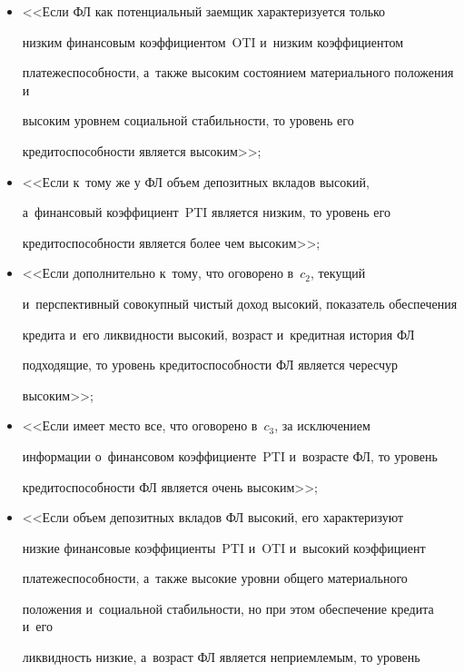  \begin{itemize} 

\item[$c_1$:] <<Если ФЛ как потенциальный заемщик характеризуется только 

низким финансовым коэффициентом~OTI и~низким коэффициентом 

пла\-те\-же\-спо\-соб\-ности, а~также высоким состоянием материального положения и~

высоким уровнем социальной стабильности, то уровень его 

кредитоспособности является высоким>>; 

  

\item[$c_2$:] <<Если к~тому же у ФЛ объем депозитных вкладов высокий, 

а~финансовый коэффициент~PTI является низким, то уровень его 

кредитоспособности является более чем высоким>>; 

  

\item[$c_3$:] <<Если дополнительно к~тому, что оговорено в~$c_2$, текущий 

и~перспективный совокупный чистый доход высокий, показатель обеспечения 

кредита и~его ликвидности высокий, возраст и~кредитная история ФЛ 

подходящие, то уровень кредитоспособности ФЛ является чересчур 

высоким>>; 

  

\item[$c_4$:] <<Если имеет место все, что оговорено в~$c_3$, за исключением 

информации о~финансовом коэффициенте~PTI и~возрасте ФЛ, то уровень 

кредитоспособности ФЛ является очень высоким>>; 

  

\item[$c_5$:] <<Если объем депозитных вкладов ФЛ высокий, его характеризуют 

низкие финансовые коэффициенты~PTI и~OTI и~высокий коэффициент 

платежеспособности, а~также высокие уровни общего материального 

положения и~социальной стабильности, но при этом обеспечение кредита и~его 

ликвидность низкие, а~возраст ФЛ является неприемлемым, то уровень 


\end{itemize}
